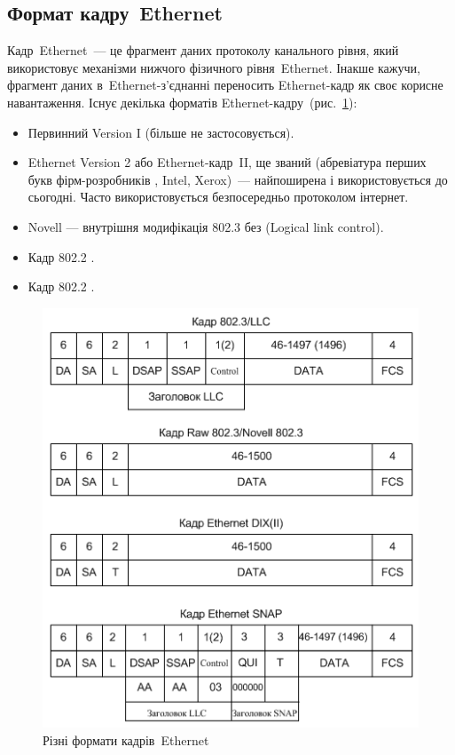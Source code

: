 \documentclass[
  ukrainian,
  simple,
  floatsection,
]{eskdnaukvd}
\begin{document}
    \subsection{Формат кадру~\textenglish{Ethernet}}
      Кадр~\textenglish{Ethernet}~— це фрагмент даних протоколу канального рівня, який використовує механізми нижчого фізичного рівня~\textenglish{Ethernet}. Інакше кажучи, фрагмент даних в~\textenglish{Ethernet}-з'єднанні переносить \textenglish{Ethernet}-кадр як своє корисне навантаження. Існує декілька форматів Ethernet-кадру~(рис.~\ref{fig:ethernet-frames}):
      \begin{itemize}
        \item Первинний \textenglish{Version I} (більше не застосовується).
        \item \textenglish{Ethernet Version 2} або \textenglish{Ethernet}-кадр~II, ще званий \textenglish{} (абревіатура перших букв фірм-розробників \textenglish{, Intel, Xerox})~— найпоширена і використовується до сьогодні. Часто використовується безпосередньо протоколом інтернет.
        \item \textenglish{Novell} — внутрішня модифікація \textenglish{} 802.3 без \textenglish{ (Logical link control)}.
        \item Кадр \textenglish{ 802.2 }.
        \item Кадр \textenglish{ 802.2 }.
      \end{itemize}

      \begin{figure}[!htbp]
        \centering
        \includegraphics[height = 12\baselineskip]{./assets/00-01-ethernet-frames.png}
        \caption{Різні формати кадрів~\textenglish{Ethernet}}
        \label{fig:ethernet-frames}
      \end{figure}
\end{document}
